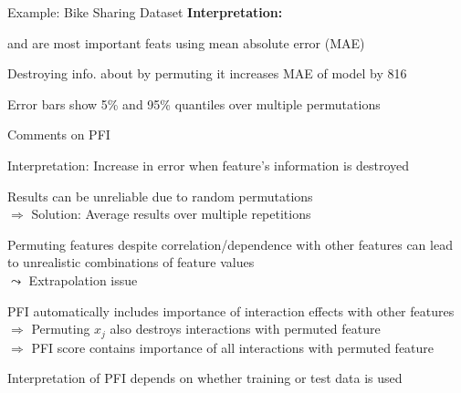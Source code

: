 \documentclass[10pt,compress,t,notes=noshow, xcolor=table]{beamer}
\begin{document}
\begin{framev}[align=top]{Example: Bike Sharing Dataset}
\textbf{Interpretation:}
\begin{itemizeM}
\item {} and  are most important feats using mean absolute error (MAE)
\item Destroying info. about  by permuting it increases MAE of model by 816
\item Error bars show 5\% and 95\% quantiles over multiple permutations
\end{itemizeM}
\end{framev}


\begin{framei}[align=top]{Comments on PFI}
\item<+-> Interpretation: Increase in error when feature's information is destroyed
\item<+-> Results can be unreliable due to random permutations \\
$\Rightarrow$ Solution: Average results over multiple repetitions
\item<+-> Permuting features despite correlation/dependence with other features can lead to unrealistic combinations of feature values\\
$\leadsto$ Extrapolation issue %
\item<+-> PFI automatically includes importance of interaction effects with other features \\
$\Rightarrow$ Permuting $x_j$ also destroys interactions with permuted feature\\
$\Rightarrow$ PFI score contains importance of all interactions with permuted feature %
\item<+-> Interpretation of PFI depends on whether training or test data is used
\end{framei}
\end{document}
